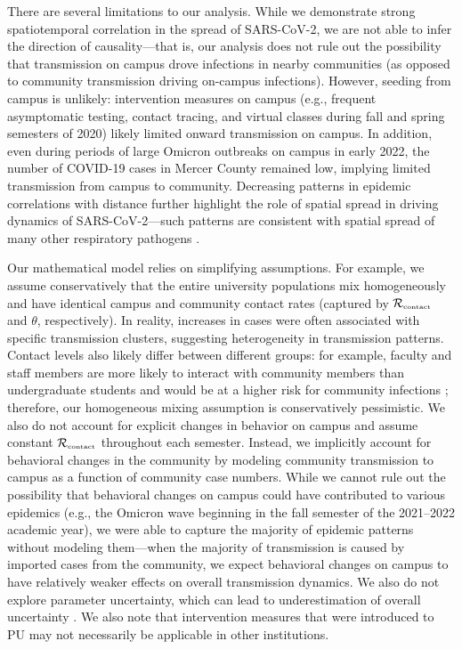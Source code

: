 \documentclass[12pt]{article}
\newcommand{\Rx}[1]{\ensuremath{{\mathcal R}_{#1}}}
\newcommand{\Rc}{\Rx{\textrm{\tiny{contact}}}}
\begin{document}
There are several limitations to our analysis.
While we demonstrate strong spatiotemporal correlation in the spread of SARS-CoV-2, we are not able to infer the direction of causality---that is, our analysis does not rule out the possibility that transmission on campus drove infections in nearby communities (as opposed to community transmission driving on-campus infections).
However, seeding from campus is unlikely: 
intervention measures on campus (e.g., frequent asymptomatic testing, contact tracing, and virtual classes during fall and spring semesters of 2020) likely limited onward transmission on campus.
In addition, even during periods of large Omicron outbreaks on campus in early 2022, the number of COVID-19 cases in Mercer County remained low, implying limited transmission from campus to community.
Decreasing patterns in epidemic correlations with distance further highlight the role of spatial spread in driving dynamics of SARS-CoV-2---such patterns are consistent with spatial spread of many other respiratory pathogens \citep{grenfell2001travelling, viboud2006synchrony, baker2019epidemic}.

Our mathematical model relies on simplifying assumptions.
For example, we assume conservatively that the entire university populations mix homogeneously and have identical campus and community contact rates (captured by $\Rc$ and $\theta$, respectively).
In reality, increases in cases were often associated with specific transmission clusters, suggesting heterogeneity in transmission patterns.
Contact levels also likely differ between different groups:
for example, faculty and staff members are more likely to interact with community members than undergraduate students and would be at a higher risk for community infections \citep{frazier2022modeling};
therefore, our homogeneous mixing assumption is conservatively pessimistic.
We also do not account for explicit changes in behavior on campus and assume constant $\Rc$ throughout each semester.
Instead, we implicitly account for behavioral changes in the community by modeling community transmission to campus as a function of community case numbers.
While we cannot rule out the possibility that behavioral changes on campus could have contributed to various epidemics (e.g., the Omicron wave beginning in the fall semester of the 2021--2022 academic year), we were able to capture the majority of epidemic patterns without modeling them---when the majority of transmission is caused by imported cases from the community, we expect behavioral changes on campus to have relatively weaker effects on overall transmission dynamics.
We also do not explore parameter uncertainty, which can lead to underestimation of overall uncertainty \citep{elderd2006uncertainty}. 
We also note that intervention measures that were introduced to PU may not necessarily be applicable in other institutions.
\end{document}
